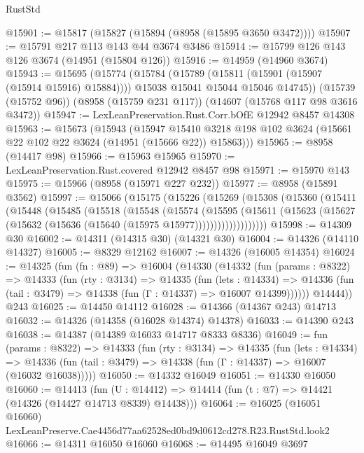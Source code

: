 \begin{lexlean}{RustStd}
\begin{coremodule}
@15901 := @15817 (@15827 (@15894 (@8958 (@15895 @3650 @3472))))
@15907 := @15791 @217 @113 @143 @44 @3674 @3486
@15914 := @15799 @126 @143 @126 @3674 (@14951 (@15804 @126))
@15916 := @14959 (@14960 @3674)
@15943 := @15695
    (@15774
      (@15784
        (@15789 (@15811 (@15901 (@15907 (@15914 @15916) @15884))))
        @15038
        @15041
        @15044
        @15046
        @14745))
    (@15739 (@15752 @96))
    (@8958 (@15759 @231 @117))
    (@14607 (@15768 @117 @98 @3616 @3472))
@15947 := LexLeanPreservation.Rust.Corr.bOfE @12942 @8457 @14308
@15963 := @15673
    (@15943
      (@15947
        @15410
        @3218
        @198
        @102
        @3624
        (@15661 @22 @102 @22 @3624 (@14951 (@15666 @22)) @15863)))
@15965 := @8958 (@14417 @98)
@15966 := @15963 @15965
@15970 := LexLeanPreservation.Rust.covered @12942 @8457 @98
@15971 := @15970 @143
@15975 := @15966 (@8958 (@15971 @227 @232))
@15977 := @8958 (@15891 @3562)
@15997 := @15066
    (@15175
      (@15226
        (@15269
          (@15308
            (@15360
              (@15411
                (@15448
                  (@15485
                    (@15518
                      (@15548
                        (@15574
                          (@15595
                            (@15611
                              (@15623
                                (@15627 (@15632 (@15636 (@15640 (@15975 @15977)))))))))))))))))))
@15998 := @14309 @30
@16002 := @14311 (@14315 @30) (@14321 @30)
@16004 := @14326 (@14110 @14327)
@16005 := @8329 @12162
@16007 := @14326 (@16005 @14354)
@16024 := @14325
    (fun (fn : @89) =>
    @16004
      (@14330
        (@14332
          (fun (params : @8322) =>
          @14333
            (fun (rty : @3134) =>
            @14335
              (fun (lets : @14334) =>
              @14336 (fun (tail : @3479) => @14338 (fun (Γ : @14337) => @16007 @14399))))))
        @14444))
    @243
@16025 := @14450 @14112
@16028 := @14366 (@14367 @243) @14713
@16032 := @14326 (@14358 (@16028 @14374) @14378)
@16033 := @14390 @243
@16038 := @14387 (@14389 @16033 @14717 @8333 @8336)
@16049 := fun (params : @8322) =>
  @14333
    (fun (rty : @3134) =>
    @14335
      (fun (lets : @14334) =>
      @14336 (fun (tail : @3479) => @14338 (fun (Γ : @14337) => @16007 (@16032 @16038)))))
@16050 := @14332 @16049
@16051 := @14330 @16050
@16060 := @14413
    (fun (U : @14412) => @14414 (fun (t : @7) => @14421 (@14326 (@14427 @14713 @8339) @14438)))
@16064 := @16025 (@16051 @16060) LexLeanPreserve.Cae4456d77aa62528ed0bd9d0612cd278.R23.RustStd.look2
@16066 := @14311 @16050 @16060
@16068 := @14495 @16049 @3697

\end{coremodule}
\end{lexlean}
